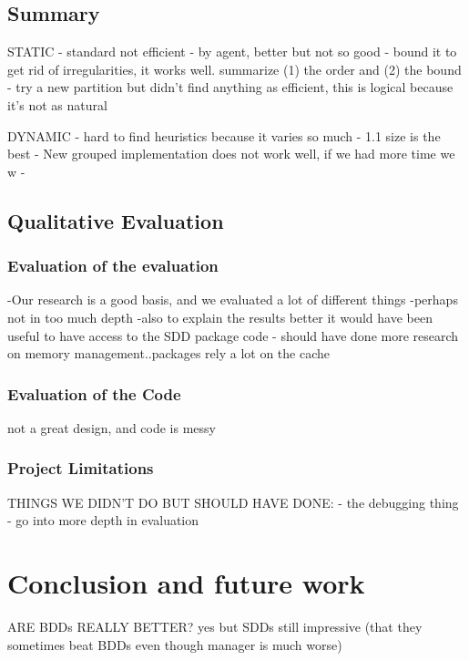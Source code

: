 \documentclass[11pt]{report}
\begin{document}
\section{Summary}

STATIC 
- standard not efficient
- by agent, better but not so good
- bound it to get rid of irregularities, it works well. summarize (1) the order and (2) the bound
- try a new partition but didn't find anything as efficient, this is logical because it's not as natural

DYNAMIC 
- hard to find heuristics because it varies so much
- 1.1 size is the best
- New grouped implementation does not work well, if we had more time we w
-

\section{Qualitative Evaluation}

\subsection{Evaluation of the evaluation}

-Our research is a good basis, and we evaluated a lot of different things
-perhaps not in too much depth
-also to explain the results better it would have been useful to have access to the SDD package code 
- should have done more research on memory management..packages rely a lot on the cache

\subsection{Evaluation of the Code}

not a great design, and code is messy

\subsection{Project Limitations}

THINGS WE DIDN'T DO BUT SHOULD HAVE DONE: 
- the debugging thing
- go into more depth in evaluation

\chapter{Conclusion and future work}

ARE BDDs REALLY BETTER?
yes but SDDs still impressive (that they sometimes beat BDDs even though manager is much worse)
\end{document}
